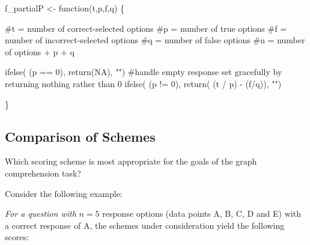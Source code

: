 \documentclass[
  letterpaper,
  DIV=11,
  numbers=noendperiod]{scrreprt}
\newenvironment{Shaded}{\begin{snugshade}}{\end{snugshade}}
\newcommand{\CommentTok}[1]{\textcolor[rgb]{0.37,0.37,0.37}{#1}}
\newcommand{\ConstantTok}[1]{\textcolor[rgb]{0.56,0.35,0.01}{#1}}
\newcommand{\ControlFlowTok}[1]{\textcolor[rgb]{0.00,0.23,0.31}{#1}}
\newcommand{\DecValTok}[1]{\textcolor[rgb]{0.68,0.00,0.00}{#1}}
\newcommand{\FunctionTok}[1]{\textcolor[rgb]{0.28,0.35,0.67}{#1}}
\newcommand{\NormalTok}[1]{\textcolor[rgb]{0.00,0.23,0.31}{#1}}
\newcommand{\OtherTok}[1]{\textcolor[rgb]{0.00,0.23,0.31}{#1}}
\newcommand{\SpecialCharTok}[1]{\textcolor[rgb]{0.37,0.37,0.37}{#1}}
\newcommand{\StringTok}[1]{\textcolor[rgb]{0.13,0.47,0.30}{#1}}
\begin{document}
\begin{Shaded}
\begin{Highlighting}[]
\NormalTok{f\_partialP }\OtherTok{\textless{}{-}} \ControlFlowTok{function}\NormalTok{(t,p,f,q) \{}

  \CommentTok{\#t = number of correct{-}selected options}
  \CommentTok{\#p = number of true options}
  \CommentTok{\#f = number of incorrect{-}selected options}
  \CommentTok{\#q = number of false options}
  \CommentTok{\#n = number of options + p + q}
  
  
  \FunctionTok{ifelse}\NormalTok{( (p }\SpecialCharTok{==} \DecValTok{0}\NormalTok{), }\FunctionTok{return}\NormalTok{(}\ConstantTok{NA}\NormalTok{), }\StringTok{""}\NormalTok{) }\CommentTok{\#handle empty response set gracefully by returning nothing rather than 0}
  \FunctionTok{ifelse}\NormalTok{( (p }\SpecialCharTok{!=} \DecValTok{0}\NormalTok{), }\FunctionTok{return}\NormalTok{( (t }\SpecialCharTok{/}\NormalTok{ p) }\SpecialCharTok{{-}}\NormalTok{ (f}\SpecialCharTok{/}\NormalTok{q)), }\StringTok{""}\NormalTok{)}
  
\NormalTok{\}}
\end{Highlighting}
\end{Shaded}

\hypertarget{comparison-of-schemes}{%
\subsection{Comparison of Schemes}\label{comparison-of-schemes}}

Which scoring scheme is most appropriate for the goals of the graph
comprehension task?

Consider the following example:

\emph{For a question with} \(n = 5\) response options (data points A, B,
C, D and E) with a correct response of A, the schemes under
consideration yield the following scores:
\end{document}

